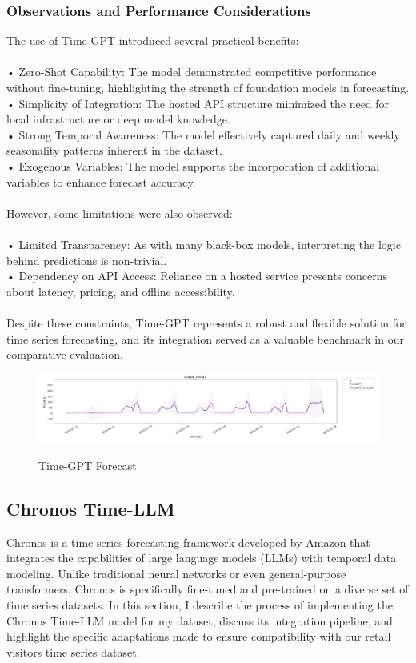 \documentclass{article}
\begin{document}
\subsubsection{Observations and Performance Considerations}
The use of Time-GPT introduced several practical benefits:\\
\\
•	Zero-Shot Capability: The model demonstrated competitive performance without fine-tuning, highlighting the strength of foundation models in forecasting.\\
•	Simplicity of Integration: The hosted API structure minimized the need for local infrastructure or deep model knowledge.\\
•	Strong Temporal Awareness: The model effectively captured daily and weekly seasonality patterns inherent in the dataset.\\
•	Exogenous Variables: The model supports the incorporation of additional variables to enhance forecast accuracy.\\
\\
However, some limitations were also observed:\\
\\
•	Limited Transparency: As with many black-box models, interpreting the logic behind predictions is non-trivial.\\
•	Dependency on API Access: Reliance on a hosted service presents concerns about latency, pricing, and offline accessibility.\\
\\
Despite these constraints, Time-GPT represents a robust and flexible solution for time series forecasting, and its integration served as a valuable benchmark in our comparative evaluation.

\begin{figure}[h]
\includegraphics[width=1\linewidth]{images/timegpt_forecast.png}
    \label{fig:mesh1}
    \caption{Time-GPT Forecast}
\end{figure}


\subsection{Chronos Time-LLM}
Chronos is a time series forecasting framework developed by Amazon that integrates the capabilities of large language models (LLMs) with temporal data modeling. Unlike traditional neural networks or even general-purpose transformers, Chronos is specifically fine-tuned and pre-trained on a diverse set of time series datasets. In this section, I describe the process of implementing the Chronos Time-LLM model for my dataset, discuss its integration pipeline, and highlight the specific adaptations made to ensure compatibility with our retail visitors time series dataset.\\
\end{document}
